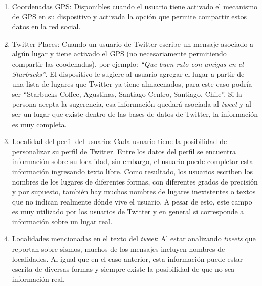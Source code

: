 \begin{enumerate}
\item Coordenadas GPS: Disponibles cuando el usuario tiene activado el mecanismo de GPS en su dispositivo y activada la opción que permite compartir estos datos en la red social.

\item Twitter Places: Cuando un usuario de Twitter escribe un mensaje asociado a algún lugar y tiene activado el GPS (no necesariamente permitiendo compartir las coodenadas), por ejemplo: \textit{``Que buen rato con amigas en el Starbucks''}. El dispositivo le sugiere al usuario agregar el lugar a partir de una lista de lugares que Twitter ya tiene almacenados, para este caso podría ser ``Starbucks Coffee, Agustinas, Santiago Centro, Santiago, Chile''. Si la persona acepta la sugerencia, esa información quedará asociada al \textit{tweet} y al ser un lugar que existe dentro de las bases de datos de Twitter, la información es muy completa.

\item Localidad del perfil del usuario: Cada usuario tiene la posibilidad de personalizar su perfil de Twitter. Entre los datos del perfil se encuentra información sobre su localidad, sin embargo, el usuario puede completar esta información ingresando texto libre. Como resultado, los usuarios escriben los nombres de los lugares de diferentes formas, con diferentes grados de precisión y por supuesto, también hay muchos nombres de lugares inexistentes o textos que no indican realmente dónde vive el usuario. A pesar de esto, este campo es muy utilizado por los usuarios de Twitter y en general si corresponde a información sobre un lugar real. 

\item Localidades mencionadas en el texto del \textit{tweet}: Al estar analizando \textit{tweets} que reportan sobre sismos, muchos de los mensajes incluyen nombres de localidades. Al igual que en el caso anterior, esta información puede estar escrita de diversas formas y siempre existe la posibilidad de que no sea información real. %

\end{enumerate} 

